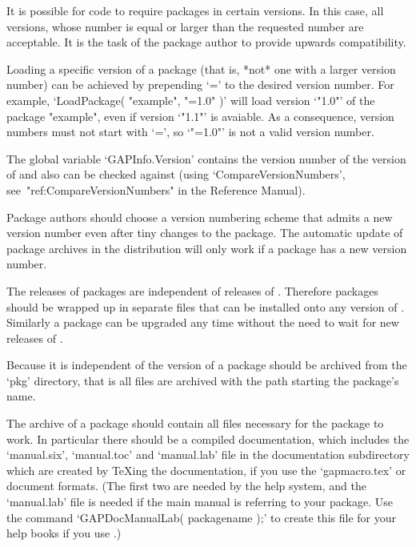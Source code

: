 It  is  possible  for  code  to require  {\GAP}  packages  in  certain
versions. In this case, all versions,  whose number is equal or larger
than  the requested  number  are acceptable.  It is  the  task of  the
package author to provide upwards compatibility.

Loading a specific version of a package (that is, *not* one with a larger
version number) can be achieved by prepending `=' to the desired
version number.
For example, `LoadPackage( "example", "=1.0" )' will load version `"1.0"'
of the package "example", even if version `"1.1"' is avaiable.
As a consequence, version numbers must not start with `=',
so `"=1.0"' is not a valid version number.

The global  variable `GAPInfo.Version' contains the  version number of
the  version  of  {\GAP}  and  also  can  be  checked  against  (using
`CompareVersionNumbers', see~"ref:CompareVersionNumbers" in the {\GAP}
Reference Manual).

Package authors should choose a version numbering scheme that admits a
new  version  number even  after  tiny  changes  to the  package.  The
automatic update of  package archives in the  {\GAP} distribution will
only work if a package has a new version number.


The releases of {\GAP} packages are independent of releases of {\GAP}.
Therefore {\GAP} packages should be wrapped up in separate files that can be
installed onto any version of {\GAP}. Similarly a {\GAP} package can be
upgraded any time without the need to wait for new releases of {\GAP}.

Because it is independent of the version of {\GAP} a {\GAP} package should be
archived from the {\GAP} `pkg'  directory, that is all files are archived with
the path starting the package's name.

The archive of  a {\GAP} package should contain all  files necessary for the
package to  work. In  particular there should  be a  compiled documentation,
which includes the  `manual.six', `manual.toc' and `manual.lab'  file in the
documentation subdirectory which are created by {\TeX}ing the documentation,
if you  use the  `gapmacro.tex' or   document  formats. (The
first two are needed by the {\GAP} help system, and the `manual.lab' file is
needed if  the main  manual is  referring to your  package. Use  the command
`GAPDocManualLab( packagename );' to create this file for your help books if
you use .)

